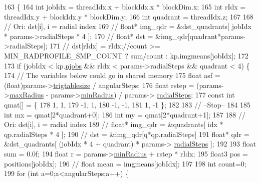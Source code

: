 \begin{DoxyCode}
163 \{
164     \textcolor{keywordtype}{int} jobIdx = threadIdx.x + blockIdx.x * blockDim.x;
165     \textcolor{keywordtype}{int} rIdx = threadIdx.y + blockIdx.y * blockDim.y;
166     \textcolor{keywordtype}{int} quadrant = threadIdx.z;
167     
168     \textcolor{comment}{// Ori: dst[i], i = radial index}
169     \textcolor{comment}{// float* img\_qdr = &dst\_quadrants[ jobIdx * params->radialSteps * 4 ];}
170     \textcolor{comment}{// float* dst = &img\_qdr[quadrant*params->radialSteps];}
171     \textcolor{comment}{// dst[rIdx] = rIdx;//count >= MIN\_RADPROFILE\_SMP\_COUNT ? sum/count : kp.imgmeans[jobIdx];}
172 
173     \textcolor{keywordflow}{if} (jobIdx < kp.\hyperlink{struct_base_kernel_params_aec40d44810d0e0a6640c66038af1fbf2}{njobs} && rIdx < params->radialSteps && quadrant < 4) \{
174         \textcolor{comment}{// The variables below could go in shared memory}
175         \textcolor{keywordtype}{float} asf = (float)params->\hyperlink{struct_q_i_params_a2078879365690b162cac67e45837a29d}{trigtablesize} / angularSteps;
176         \textcolor{keywordtype}{float} rstep = (params->\hyperlink{struct_q_i_params_a59a4abd887cfec3392bb5ecd6891d7d6}{maxRadius} - params->\hyperlink{struct_q_i_params_a4c3b954348ae3ee381eab69122983515}{minRadius}) / params->
      \hyperlink{struct_q_i_params_a19b7d550113364de4e4f11e2c9cfea0e}{radialSteps};
177         \textcolor{keyword}{const} \textcolor{keywordtype}{int} qmat[] = \{
178             1, 1,
179             -1, 1,
180             -1, -1,
181             1, -1 \};
182 
183         \textcolor{comment}{// --Stop--}
184 
185         \textcolor{keywordtype}{int} mx = qmat[2*quadrant+0];
186         \textcolor{keywordtype}{int} my = qmat[2*quadrant+1];
187 
188         \textcolor{comment}{// Ori: dst[i], i = radial index}
189         \textcolor{comment}{// float* img\_qdr = &quadrants[ idx * qp.radialSteps * 4 ];}
190         \textcolor{comment}{// dst = &img\_qdr[q*qp.radialSteps]}
191         \textcolor{keywordtype}{float}* qdr = &dst\_quadrants[ (jobIdx * 4 + quadrant) * params->
      \hyperlink{struct_q_i_params_a19b7d550113364de4e4f11e2c9cfea0e}{radialSteps} ];
192         
193         \textcolor{keywordtype}{float} sum = 0.0f;
194         \textcolor{keywordtype}{float} r = params->\hyperlink{struct_q_i_params_a4c3b954348ae3ee381eab69122983515}{minRadius} + rstep * rIdx;
195         float3 pos = positions[jobIdx];
196 \textcolor{comment}{//      float mean = imgmeans[jobIdx];}
197 
198         \textcolor{keywordtype}{int} count=0;
199         for (\textcolor{keywordtype}{int} a=0;a<angularSteps;a++) \{

\end{DoxyCode}
